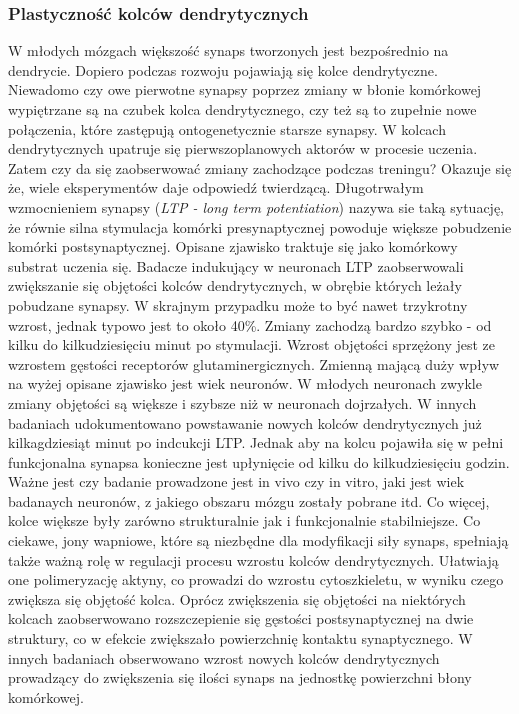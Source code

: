 \documentclass{article}
\begin{document}
\subsubsection{Plastyczność kolców dendrytycznych}
W młodych mózgach większość synaps tworzonych jest bezpośrednio na dendrycie.
Dopiero podczas rozwoju pojawiają się kolce dendrytyczne.
Niewadomo czy owe pierwotne synapsy poprzez zmiany w błonie komórkowej wypiętrzane są na czubek kolca dendrytycznego, czy też są to zupełnie nowe połączenia, które zastępują ontogenetycznie starsze synapsy.
W kolcach dendrytycznych upatruje się pierwszoplanowych aktorów w procesie uczenia.
Zatem czy da się zaobserwować zmiany zachodzące podczas treningu?
Okazuje się że, wiele eksperymentów daje odpowiedź twierdzącą.
Długotrwałym wzmocnieniem synapsy (\emph{LTP - long term potentiation}) nazywa sie taką sytuację, że równie silna stymulacja komórki presynaptycznej powoduje większe pobudzenie komórki postsynaptycznej.
Opisane zjawisko traktuje się jako komórkowy substrat uczenia się.
Badacze indukujący w neuronach LTP zaobserwowali zwiększanie się objętości kolców dendrytycznych, w obrębie których leżały pobudzane synapsy.
W skrajnym przypadku może to być nawet trzykrotny wzrost, jednak typowo jest to około 40\%.
Zmiany zachodzą bardzo szybko - od kilku do kilkudziesięciu minut po stymulacji. 
Wzrost objętości sprzężony jest ze wzrostem gęstości receptorów glutaminergicznych.
Zmienną mającą duży wpływ na wyżej opisane zjawisko jest wiek neuronów.
W młodych neuronach zwykle zmiany objętości są większe i szybsze niż w neuronach dojrzałych.
W innych badaniach udokumentowano powstawanie nowych kolców dendrytycznych już kilkagdziesiąt minut po indcukcji LTP.
Jednak aby na kolcu pojawiła się w pełni funkcjonalna synapsa konieczne jest upłynięcie od kilku do kilkudziesięciu godzin\cite{Sala2014}.
Ważne jest czy badanie prowadzone jest in vivo czy in vitro, jaki jest wiek badanaych neuronów, z jakiego obszaru mózgu zostały pobrane itd.
Co więcej, kolce większe były zarówno strukturalnie jak i funkcjonalnie stabilniejsze.
Co ciekawe, jony wapniowe, które są niezbędne dla modyfikacji siły synaps, spełniają także ważną rolę w regulacji procesu wzrostu kolców dendrytycznych.
Ułatwiają one polimeryzację aktyny, co prowadzi do wzrostu cytoszkieletu, w wyniku czego zwiększa się objętość kolca\cite{Costa2007}.
Oprócz zwiększenia się objętości na niektórych kolcach zaobserwowano rozszczepienie się gęstości postsynaptycznej na dwie struktury, co w efekcie zwiększało powierzchnię kontaktu synaptycznego.
W innych badaniach obserwowano wzrost nowych kolców dendrytycznych prowadzący do zwiększenia się ilości synaps na jednostkę powierzchni błony komórkowej.
\end{document}
